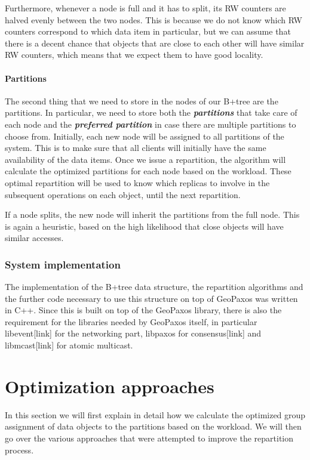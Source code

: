 Furthermore, whenever a node is full and it has to split, its RW counters are halved evenly between the two nodes. This is because we do not know which RW counters correspond to which data item in particular, but we can assume that there is a decent chance that objects that are close to each other will have similar RW counters, which means that we expect them to have good locality.

\subsubsection{Partitions}
The second thing that we need to store in the nodes of our B+tree are the partitions. In particular, we need to store both the \textbf{\emph{partitions}} that take care of each node and the \textbf{\emph{preferred partition}} in case there are multiple partitions to choose from. Initially, each new node will be assigned to all partitions of the system. This is to make sure that all clients will initially have the same availability of the data items. Once we issue a repartition, the algorithm will calculate the optimized partitions for each node based on the workload. These optimal repartition will be used to know which replicas to involve in the subsequent operations on each object, until the next repartition.

If a node splits, the new node will inherit the partitions from the full node. This is again a heuristic, based on the high likelihood that close objects will have similar accesses.

\subsection{System implementation}\label{sec:system-implementation}
The implementation of the B+tree data structure, the repartition algorithms and the further code necessary to use this structure on top of GeoPaxos was written in C++. Since this is built on top of the GeoPaxos library, there is also the requirement for the libraries needed by GeoPaxos itself, in particular libevent[link] for the networking part, libpaxos for consensus[link] and libmcast[link] for atomic multicast.

\chapter{Optimization approaches}\label{sec:optimization-approaches}
In this section we will first explain in detail how we calculate the optimized group assignment of data objects to the partitions based on the workload. We will then go over the various approaches that were attempted to improve the repartition process. 

